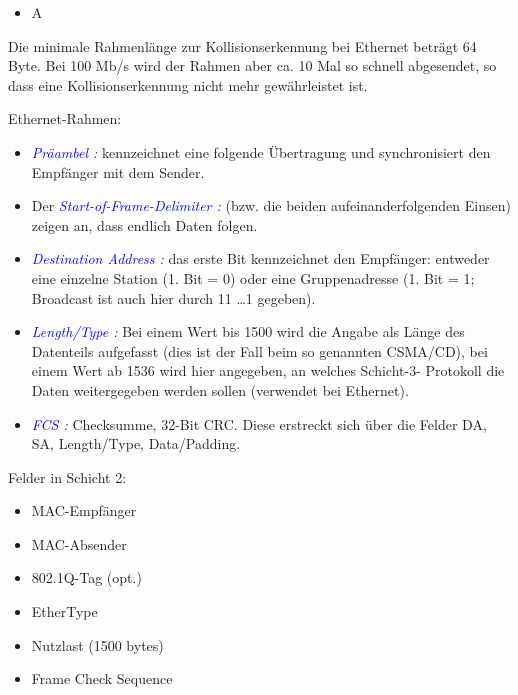 \begin{itemize}
    \item  \todo A
\end{itemize}

Die minimale Rahmenlänge zur Kollisionserkennung bei Ethernet beträgt 64 Byte.
Bei 100 Mb/s wird der Rahmen aber ca. 10 Mal so schnell abgesendet, so dass eine Kollisionserkennung nicht mehr gewährleistet ist.

Ethernet-Rahmen:
\begin{itemize}
    \item \textcolor{blue}{\textit{Präambel :}} kennzeichnet eine folgende Übertragung und synchronisiert den Empfänger mit dem Sender.
    \item Der \textcolor{blue}{\textit{Start-of-Frame-Delimiter :}} (bzw. die beiden aufeinanderfolgenden Einsen) zeigen an, dass endlich Daten folgen.
    \item \textcolor{blue}{\textit{Destination Address :}} das erste Bit kennzeichnet den Empfänger: entweder eine einzelne Station (1. Bit = 0) oder eine Gruppenadresse (1. Bit = 1; Broadcast ist auch hier durch 11 \ldots 1 gegeben).
    \item \textcolor{blue}{\textit{Length/Type :}} Bei einem Wert bis 1500 wird die Angabe als Länge des Datenteils aufgefasst (dies ist der Fall beim so genannten CSMA/CD), bei einem Wert ab 1536 wird hier angegeben, an welches Schicht-3- Protokoll die Daten weitergegeben werden sollen (verwendet bei Ethernet).
    \item \textcolor{blue}{\textit{FCS :}} Checksumme, 32-Bit CRC. Diese erstreckt sich über die Felder DA, SA, Length/Type, Data/Padding.
\end{itemize}
Felder in Schicht 2:
\begin{itemize}
    \item MAC-Empfänger
    \item MAC-Absender
    \item 802.1Q-Tag (opt.)
    \item EtherType
    \item Nutzlast (1500 bytes)
    \item Frame Check Sequence
\end{itemize}

